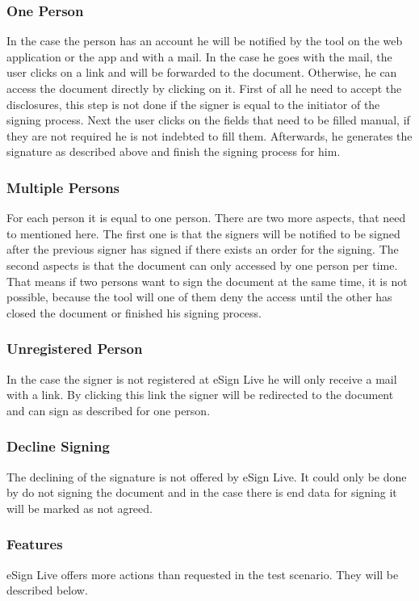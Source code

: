 \subsubsection{One Person}
In the case the person has an account he will be notified by the tool on the web application or the \gls{app} and with a mail. In the case he goes with the mail, the user clicks on a link and will be forwarded to the document. Otherwise, he can access the document directly by clicking on it. First of all he need to accept the disclosures, this step is not done if the signer is equal to the initiator of the signing process. Next the user clicks on the fields that need to be filled manual, if they are not required he is not indebted to fill them. Afterwards, he generates the signature as described above and finish the signing process for him.

\subsubsection{Multiple Persons}
For each person it is equal to one person. There are two more aspects, that need to mentioned here. The first one is that the signers will be notified to be signed after the previous signer has signed if there exists an order for the signing. The second aspects is that the document can only accessed by one person per time. That means if two persons want to sign the document at the same time, it is not possible, because the tool will one of them deny the access until the other has closed the document or finished his signing process.

\subsubsection{Unregistered Person}
In the case the signer is not registered at eSign Live he will only receive a mail with a link. By clicking this link the signer will be redirected to the document and can sign as described for one person.

\subsubsection{Decline Signing}
The declining of the signature is not offered by eSign Live. It could only be done by do not signing the document and in the case there is end data for signing it will be marked as not agreed.

\subsubsection{Features}
eSign Live offers more actions than requested in the test scenario. They will be described below.


